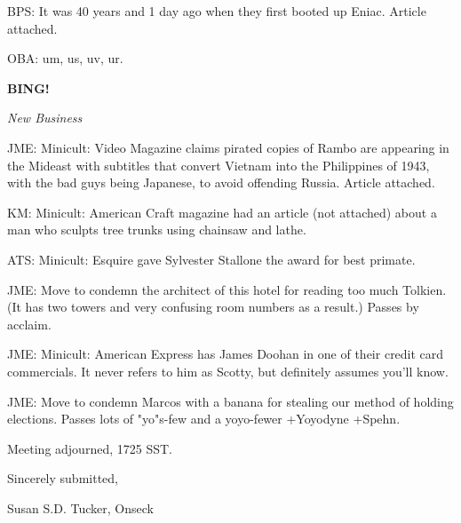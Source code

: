 \documentclass[12pt]{article}
\newcommand{\bing}{{\bf BING!} }
\newcommand{\goto}[1]{\bing \vskip 12pt \centerline{{\em{#1}}}}
\begin{document}
BPS: It was 40 years and 1 day ago when they first booted up Eniac. Article attached.

OBA: um, us, uv, ur.

\goto{New Business}

JME: Minicult: Video Magazine claims pirated copies of Rambo are appearing in the Mideast with subtitles that convert Vietnam into the Philippines of 1943, with the bad guys being Japanese, to avoid offending Russia. Article attached.

KM: Minicult: American Craft magazine had an article (not attached) about a man who sculpts tree trunks using chainsaw and lathe.

ATS: Minicult: Esquire gave Sylvester Stallone the award for best primate.

JME: Move to condemn the architect of this hotel for reading too much Tolkien. (It has two towers and very confusing room numbers as a result.) Passes by acclaim.

JME: Minicult: American Express has James Doohan in one of their credit card commercials. It never refers to him as Scotty, but definitely assumes you'll know.

JME: Move to condemn Marcos with a banana for stealing our method of holding elections. Passes lots of "yo"s-few and a yoyo-fewer +Yoyodyne +Spehn.

\vspace{12pt}

\noindent
Meeting adjourned, 1725 SST.

\vspace{18pt}

\centerline{Sincerely submitted,}
\centerline{Susan S.D. Tucker, Onseck}
\end{document}
